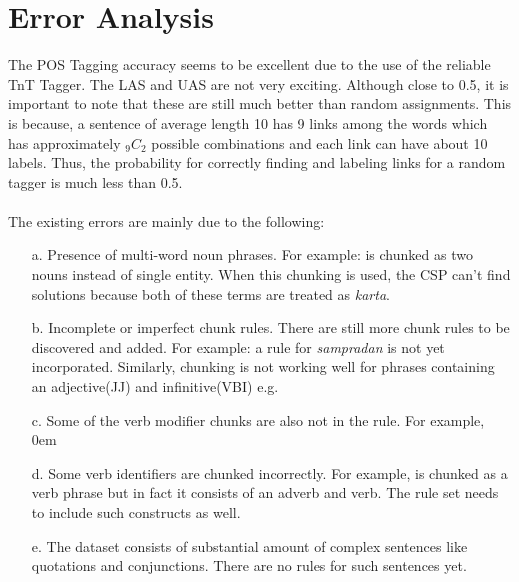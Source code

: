 \section{Error Analysis}
The POS Tagging accuracy seems to be excellent due to the use of the reliable
TnT Tagger. The LAS and UAS are not very exciting. Although close to 0.5, it is
important to note that these are still much better than random assignments.
This is because, a sentence of average length 10 has 9 links among the words
which has approximately ${}_{9}C_{2}$ possible combinations and each link can have about 10
labels. Thus, the probability for correctly finding and labeling links for a
random tagger is much less than 0.5.
\\~\\
The existing errors are mainly due to the following:
\begin{itemize}
    \item[a.] Presence of multi-word noun phrases. For example: 
        \normalfont
        is chunked as two nouns instead of single entity. When this
        chunking is used, the CSP can't find solutions because both of these
        terms are treated as \textit{karta}.
    \item[b.] Incomplete or imperfect chunk rules. There are still more chunk
        rules to be discovered and added. For example: a rule for
        \textit{sampradan} \textendash { } 
        \normalfont
        is not yet incorporated.
        Similarly, chunking is not working well for phrases containing an
        adjective(JJ) and infinitive(VBI) e.g. 
        \normalfont
    \item[c.] Some of the verb modifier chunks are also not in the rule. For
        example, 
        \normalfont
   \itemsep0em
    \item[d.] Some verb identifiers are chunked incorrectly. For example,
        \normalfont
        is chunked as a verb phrase but in fact it consists of an
        adverb and verb. The rule set needs to include such constructs as well.
    \item[e.] The dataset consists of substantial amount of complex sentences
        like quotations and conjunctions. There are no rules for such sentences
        yet.
\end{itemize}
